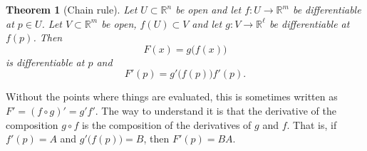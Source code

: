 \documentclass[12pt]{book}
\newcommand{\R}{{\mathbb{R}}}
\theoremstyle{plain}
\newtheorem{thm}{Theorem}[section]
\theoremstyle{remark}
\theoremstyle{definition}
\theoremstyle{exercise}
\theoremstyle{example}
\begin{document}
\begin{thm}[Chain rule]
Let $U \subset \R^n$ be open and let $f \colon U \to \R^m$ be
differentiable at $p \in U$.  Let $V \subset \R^m$ be open,
$f(U) \subset V$ and let $g \colon V \to \R^\ell$ be differentiable
at $f(p)$.  Then
\begin{equation*}
F(x) = g\bigl(f(x)\bigr)
\end{equation*}
is differentiable at $p$ and
\begin{equation*}
F'(p) = g'\bigl(f(p)\bigr) f'(p) .
\end{equation*}
\end{thm}

Without the points where things are evaluated, this is sometimes written as
$F' = {(f \circ g)}' = g' f'$.  The way to
understand it is that the derivative of the composition $g \circ f$
is the composition of the derivatives of $g$ and $f$.  That is, if
$f'(p) = A$ and $g'\bigl(f(p)\bigr) = B$, then $F'(p) = BA$.
\end{document}
